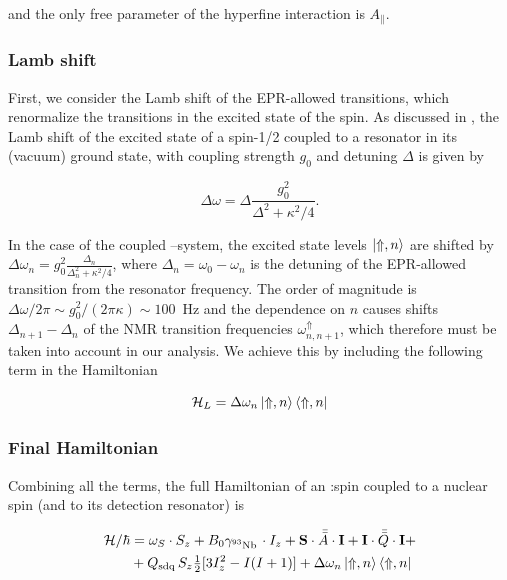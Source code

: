 and the only free parameter of the hyperfine interaction is $A_\parallel$.

\subsubsection{Lamb shift}

First, we consider the Lamb shift of the EPR-allowed transitions, which renormalize the \Nb transitions in the excited state of the \Er spin. As discussed in , the Lamb shift of the excited state of a spin-1/2 coupled to a resonator in its (vacuum) ground state, with coupling strength $g_0$ and detuning $\Delta$ is given by

\begin{equation}
\Delta\omega = \Delta \frac{g_0^2}{\Delta^2 + \kappa^2/4}.
\end{equation}

In the case of the coupled \Nb--\Er system, the \Er excited state levels $\ket{\Uparrow,n}$ are shifted by $\Delta \omega_n = g_0^2 \frac{\Delta_n}{\Delta_n^2 + \kappa^2/4}$, where $\Delta_n = \omega_0 - \omega_n$ is the detuning of the EPR-allowed transition from the resonator frequency. The order of magnitude is $\Delta \omega / 2\pi \sim g_0^2 / (2\pi\kappa) \sim 100$~Hz and the dependence on $n$ causes shifts $\Delta_{n+1} - \Delta_n$ of the NMR transition frequencies $\omega_{n,n+1}^\Uparrow $, which therefore must be taken into account in our analysis. We achieve this by including the following term in the Hamiltonian

\begin{equation}
    \mathcal{H}_L = \Delta \omega_n \ket{\Uparrow,n}\bra{\Uparrow,n}
\end{equation}

\subsubsection{Final Hamiltonian}

Combining all the terms, the full Hamiltonian of an \Er:\Ca spin coupled to a \Nb nuclear spin (and to its detection resonator) is

\begin{align}
\begin{split}
        \mathcal{H}/\hbar &= \omega_S\cdot S_z + B_0 \gamma_{\text{$^{93}$Nb\,}} \cdot I_z +\mathbf{S} \cdot \bar{\bar{A}} \cdot \mathbf{I} + \mathbf{I} \cdot \bar{\bar{Q}} \cdot \mathbf{I} + \\ 
        &+ Q_\mathrm{sdq} \, S_z \tfrac{1}{2}  [3 I_z^2 - I(I+1) ]  + \Delta \omega_n \ket{\Uparrow,n}\bra{\Uparrow,n}
\end{split}
\label{eq:full_hamiltonian_all}
\end{align}

